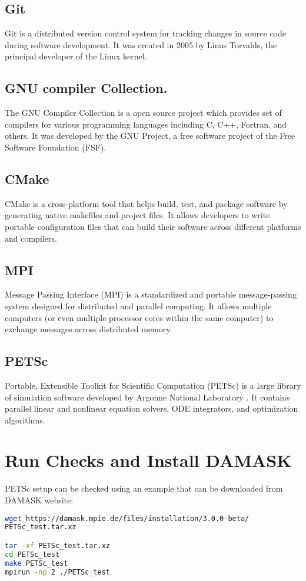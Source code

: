 \subsection{Git}
Git is a distributed version control system for tracking changes in source code during software development. It was created in 2005 by Linus Torvalds, the principal developer of the Linux kernel.
\subsection{GNU compiler Collection.}
The GNU Compiler Collection is a open source project which provides set of compilers for various programming languages including C, C++, Fortran, and others. It was developed by the GNU Project, a free software project of the Free Software Foundation (FSF).
\subsection{CMake}
CMake is a cross-platform tool that helps build, test, and package software by generating native makefiles and project files. It allows developers to write portable configuration files that can build their software across different platforms and compilers.
\subsection{MPI}
Message Passing Interface (MPI) is a standardized and portable message-passing system designed for distributed and parallel computing. It allows multiple computers (or even multiple processor cores within the same computer) to exchange messages across distributed memory.
\subsection{PETSc}
Portable, Extensible Toolkit for Scientific Computation (PETSc) is a large library of simulation software developed by Argonne National Laboratory \cite{balay2020petsc}. It contains parallel linear and nonlinear equation solvers, ODE integrators, and optimization algorithms.

\section{Run Checks and Install DAMASK}
PETSc setup can be checked using an example that can be downloaded from DAMASK website:

\begin{lstlisting}[language=bash, basicstyle=\small\ttfamily, frame=single]
wget https://damask.mpie.de/files/installation/3.0.0-beta/
PETSc_test.tar.xz

tar -xf PETSc_test.tar.xz
cd PETSc_test
make PETSc_test
mpirun -np 2 ./PETSc_test
\end{lstlisting}


